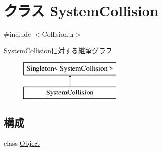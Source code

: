 \hypertarget{class_system_collision}{\section{クラス System\-Collision}
\label{class_system_collision}
}


{\ttfamily \#include $<$Collision.\-h$>$}

System\-Collisionに対する継承グラフ\begin{figure}[H]
\begin{center}
\leavevmode
\includegraphics[height=2.000000cm]{d0/d54/class_system_collision}
\end{center}
\end{figure}
\subsection*{構成}
\begin{DoxyCompactItemize}
\item 
class \hyperlink{class_system_collision_1_1_object}{Object}
\end{DoxyCompactItemize}
